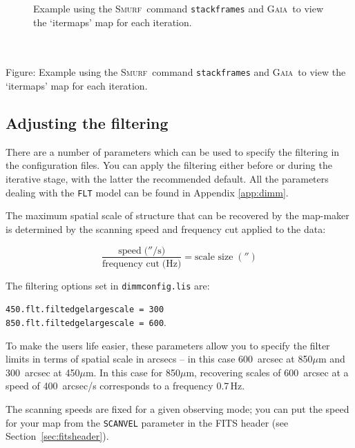 \documentclass[twoside,11pt]{article}
\newcommand{\htmladdimg}[1]{}
\newenvironment{latexonly}{}{}
\newcommand{\xref}[3]{#1}
\newcommand{\xlabel}[1]{}
\renewcommand{\_}{\texttt{\symbol{95}}}
\newenvironment{fmpage}[1]{\begin{lrbox}{\fmbox}\begin{minipage}{#1}}{\end{minipage}\end{lrbox}\fbox{\usebox{\fmbox}}}
\newcommand{\gaia}{\xref{\textsc{Gaia}}{sun214}{}}
\newcommand{\smurf}{\xref{\textsc{Smurf}}{sun258}{}}
\begin{document}
\begin{latexonly}
\begin{figure}[ht!]
\begin{center}
\begin{fmpage}{0.95\linewidth}
\end{fmpage}
\end{center}
\caption{\small Example using the \smurf\ command \texttt{stackframes} and
\gaia\ to view the `itermaps' map for each iteration.}
\label{fig:stack}
\end{figure}
\end{latexonly}

\begin{htmlonly}
 \label{fig:stack} \htmladdimg{sc21_view_itermaps.png}
 \\ \\
 Figure: Example using the \smurf\ command \texttt{stackframes} and
 \gaia\ to view the `itermaps' map for each iteration.
\end{htmlonly}

\subsection{\xlabel{filter}Adjusting the filtering}
\label{sec:filt}

There are a number of parameters which can be used to specify the
filtering in the configuration files. You can apply the filtering
either before or during the iterative stage, with the latter the
recommended default. All the parameters dealing with the \texttt{FLT}
model can be found in Appendix \ref{app:dimm}.

The maximum spatial scale of structure that can be recovered by the
map-maker is determined by the scanning speed and frequency cut
applied to the data:

\begin{equation}
\frac{\mbox{speed}\;(''/\mbox{s)}}{\mbox{frequency cut}\;(\mbox{Hz)}}=\mbox{scale size}\;('')
\end{equation}

The filtering options set in \texttt{dimmconfig.lis} are:

\texttt{450.flt.filt\_edge\_largescale = 300} \\
\texttt{850.flt.filt\_edge\_largescale = 600}.

To make the users life easier, these parameters allow you to specify
the filter limits in terms of spatial scale in arcsecs -- in this case
600~arcsec at 850$\mu$m and 300~arcsec at 450$\mu$m. In this case for
850$\mu$m, recovering scales of 600~arcsec at a speed of 400~arcsec/s
corresponds to a frequency 0.7\,Hz.

The scanning speeds are fixed for a given observing mode; you can put
the speed for your map from the \texttt{SCAN\_VEL} parameter in the
FITS header (see Section~\ref{sec:fitsheader}).
\end{document}
